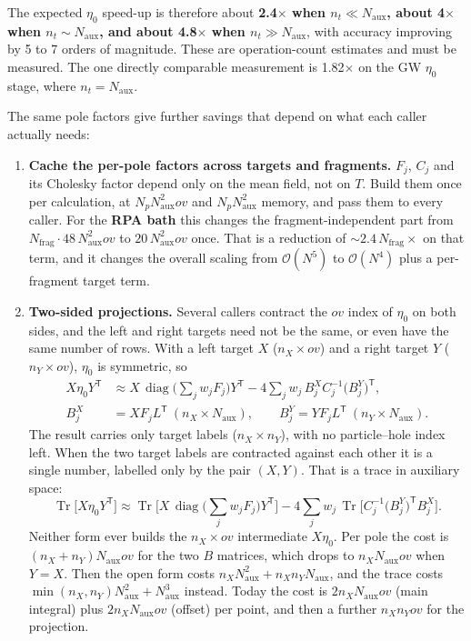 \documentclass[11pt,a4paper]{article}
\newcommand{\Naux}{N_{\mathrm{aux}}}
\newcommand{\nt}{n_{t}}
\newcommand{\Np}{N_{p}}
\newcommand{\Nfrag}{N_{\mathrm{frag}}}
\newcommand{\ov}{ov}
\newcommand{\Tr}{\operatorname{Tr}}
\newcommand{\diag}{\operatorname{diag}}
\begin{document}
The expected $\eta_0$ speed-up is therefore about \textbf{2.4$\times$ when $\nt\ll\Naux$,
about 4$\times$ when $\nt\sim\Naux$, and about 4.8$\times$ when $\nt\gg\Naux$}, with accuracy
improving by 5 to 7 orders of magnitude. These are operation-count estimates and must be
measured. The one directly comparable measurement is 1.82$\times$ on the GW $\eta_0$ stage,
where $\nt=\Naux$.

\noindent The same pole factors give further savings that depend on what each caller actually needs:
\begin{enumerate}
  \item \textbf{Cache the per-pole factors across targets and fragments.} $F_j$, $C_j$ and its
        Cholesky factor depend only on the mean field, not on $T$. Build them once per
        calculation, at $\Np\Naux^2\ov$ and $\Np\Naux^2$ memory, and pass them to every caller.
        For the \textbf{RPA bath} this changes the fragment-independent part from
        $\Nfrag\cdot48\,\Naux^2\ov$ to $20\,\Naux^2\ov$ once. That is a reduction of
        ${\sim}2.4\,\Nfrag\times$ on that term, and it changes the overall scaling from
        $\mathcal{O}(N^5)$ to $\mathcal{O}(N^4)$ plus a per-fragment target term.
  \item \textbf{Two-sided projections.} Several callers contract the $\ov$ index of $\eta_0$
        on both sides, and the left and right targets need not be the same, or even have the
        same number of rows. With a left target $X$ ($n_X\times\ov$) and a right target $Y$
        ($n_Y\times\ov$), $\eta_0$ is symmetric, so
        \begin{equation}
          \begin{aligned}
          X\eta_0Y^{\mathsf T} &\approx X\,\diag\Big(\sum_j w_jF_j\Big)Y^{\mathsf T}
            - 4\sum_j w_j\,B_j^X C_j^{-1}\big(B_j^Y\big)^{\mathsf T},\\
          B_j^X &= XF_jL^{\mathsf T}\ (n_X\times\Naux),\qquad B_j^Y = YF_jL^{\mathsf T}\ (n_Y\times\Naux).
          \end{aligned}
        \end{equation}
        The result carries only target labels ($n_X\times n_Y$), with no particle--hole index
        left. When the two target labels are contracted against each other it is a single
        number, labelled only by the pair $(X,Y)$. That is a trace in auxiliary space:
        \begin{equation}
          \Tr\big[X\eta_0Y^{\mathsf T}\big] \approx
            \Tr\Big[X\,\diag\Big(\sum_j w_jF_j\Big)Y^{\mathsf T}\Big]
            - 4\sum_j w_j\,\Tr\Big[C_j^{-1}\big(B_j^Y\big)^{\mathsf T}B_j^X\Big].
        \end{equation}
        Neither form ever builds the $n_X\times\ov$ intermediate $X\eta_0$. Per pole the cost
        is $(n_X+n_Y)\Naux\ov$ for the two $B$ matrices, which drops to $n_X\Naux\ov$ when
        $Y=X$. Then the open form costs $n_X\Naux^2 + n_Xn_Y\Naux$, and the trace costs
        $\min(n_X,n_Y)\Naux^2+\Naux^3$ instead. Today the cost is $2n_X\Naux\ov$ (main
        integral) plus $2n_X\Naux\ov$ (offset) per point, and then a further $n_Xn_Y\ov$ for
        the projection.


\end{enumerate}
\end{document}

